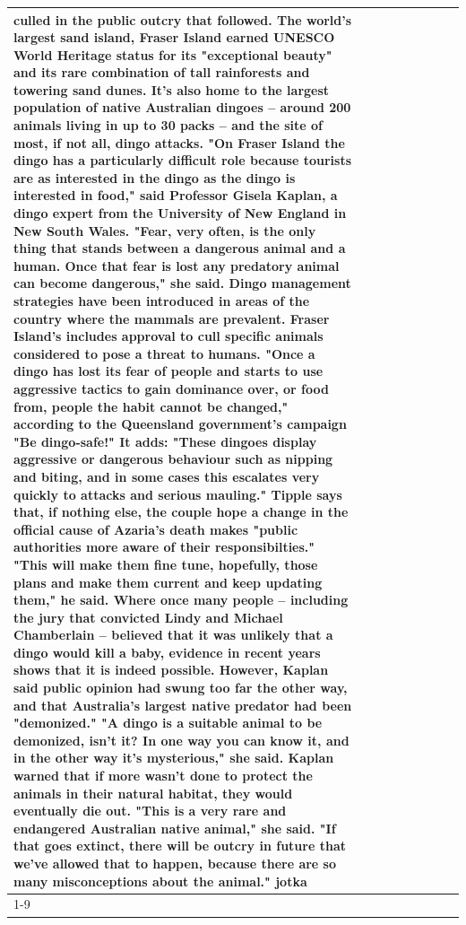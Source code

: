 \begin{table}[H]
\begin{tabular}{lllrlllll}
culled in the public outcry that followed. The world's largest sand island, Fraser Island earned UNESCO World Heritage status for its "exceptional beauty" and its rare combination of tall rainforests and towering sand dunes. It's also home to the largest population of native Australian dingoes -- around 200 animals living in up to 30 packs -- and the site of most, if not all, dingo attacks. "On Fraser Island the dingo has a particularly difficult role because tourists are as interested in the dingo as the dingo is interested in food," said Professor Gisela Kaplan, a dingo expert from the University of New England in New South Wales. "Fear, very often, is the only thing that stands between a dangerous animal and a human. Once that fear is lost any predatory animal can become dangerous," she said. Dingo management strategies have been introduced in areas of the country where the mammals are prevalent. Fraser Island's includes approval to cull specific animals considered to pose a threat to humans. "Once a dingo has lost its fear of people and starts to use aggressive tactics to gain dominance over, or food from, people the habit cannot be changed," according to the Queensland government's campaign "Be dingo-safe!" It adds: "These dingoes display aggressive or dangerous behaviour such as nipping and biting, and in some cases this escalates very quickly to attacks and serious mauling." Tipple says that, if nothing else, the couple hope a change in the official cause of Azaria's death makes "public authorities more aware of their responsibilties." "This will make them fine tune, hopefully, those plans and make them current and keep updating them," he said. Where once many people -- including the jury that convicted Lindy and Michael Chamberlain -- believed that it was unlikely that a dingo would kill a baby, evidence in recent years shows that it is indeed possible. However, Kaplan said public opinion had swung too far the other way, and that Australia's largest native predator had been "demonized." "A dingo is a suitable animal to be demonized, isn't it? In one way you can know it, and in the other way it's mysterious," she said. Kaplan warned that if more wasn't done to protect the animals in their natural habitat, they would eventually die out. "This is a very rare and endangered Australian native animal," she said. "If that goes extinct, there will be outcry in future that we've allowed that to happen, because there are so many misconceptions about the animal." jotka \\
\cline{1-9}

\end{tabular}
\end{table}
